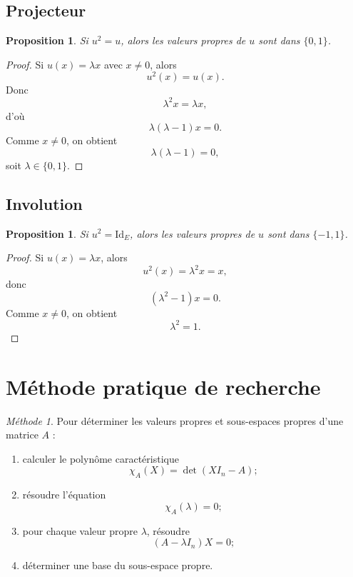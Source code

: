 \documentclass[11pt,a4paper]{article}
\newtheorem{proposition}[definition]{Proposition}
\theoremstyle{remark}
\newtheorem*{methode}{Méthode}
\newcommand{\id}{\mathrm{Id}}
\newcommand{\chiA}{\chi_A}
\begin{document}
\subsection{Projecteur}

\begin{proposition}
Si \(u^2=u\), alors les valeurs propres de \(u\) sont dans \(\{0,1\}\).
\end{proposition}

\begin{proof}
Si \(u(x)=\lambda x\) avec \(x\neq 0\), alors
\[
u^2(x)=u(x).
\]
Donc
\[
\lambda^2x=\lambda x,
\]
d’où
\[
\lambda(\lambda-1)x=0.
\]
Comme \(x\neq 0\), on obtient
\[
\lambda(\lambda-1)=0,
\]
soit \(\lambda\in\{0,1\}\).
\end{proof}

\subsection{Involution}

\begin{proposition}
Si \(u^2=\id_E\), alors les valeurs propres de \(u\) sont dans \(\{-1,1\}\).
\end{proposition}

\begin{proof}
Si \(u(x)=\lambda x\), alors
\[
u^2(x)=\lambda^2x=x,
\]
donc
\[
(\lambda^2-1)x=0.
\]
Comme \(x\neq 0\), on obtient
\[
\lambda^2=1.
\]
\end{proof}

\section{Méthode pratique de recherche}

\begin{methode}
Pour déterminer les valeurs propres et sous-espaces propres d’une matrice \(A\) :
\begin{enumerate}
    \item calculer le polynôme caractéristique
    \[
    \chiA(X)=\det(XI_n-A) ;
    \]
    \item résoudre l’équation
    \[
    \chiA(\lambda)=0 ;
    \]
    \item pour chaque valeur propre \(\lambda\), résoudre
    \[
    (A-\lambda I_n)X=0 ;
    \]
    \item déterminer une base du sous-espace propre.
\end{enumerate}
\end{methode}
\end{document}
